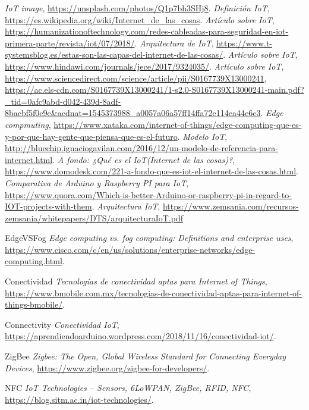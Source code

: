\documentclass{article}
\begin{document}
\begin{thebibliography}{9}

 \textit{IoT image}, \url{https://unsplash.com/photos/Q1p7bh3SHj8}.
 \textit{Definición IoT}, \url{https://es.wikipedia.org/wiki/Internet\_de\_las\_cosas}.
 \textit{Artículo sobre IoT}, \url{https://humanizationoftechnology.com/redes-cableadas-para-seguridad-en-iot-primera-parte/revista/iot/07/2018/}.
 \textit{Arquitectura de IoT}, \url{https://www.t-systemsblog.es/estas-son-las-capas-del-internet-de-las-cosas/}.
 \textit{Artículo sobre IoT}, \url{https://www.hindawi.com/journals/jece/2017/9324035/}.
 \textit{Artículo sobre IoT}, \url{https://www.sciencedirect.com/science/article/pii/S0167739X13000241}, \url{https://ac.els-cdn.com/S0167739X13000241/1-s2.0-S0167739X13000241-main.pdf?_tid=0afc9abd-d042-439d-8adf-8bacbf5f0c9e&acdnat=1545373988_a0057a06a57ff14ffa72e114ea44e6c3}.
 \textit{Edge compmuting}, \url{https://www.xataka.com/internet-of-things/edge-computing-que-es-y-por-que-hay-gente-que-piensa-que-es-el-futuro}.
 \textit{Modelo IoT}, \url{http://bluechip.ignaciogavilan.com/2016/12/un-modelo-de-referencia-para-internet.html}.
 \textit{A fondo: ¿Qué es el IoT(Internet de las cosas)?}, \url{https://www.domodesk.com/221-a-fondo-que-es-iot-el-internet-de-las-cosas.html}.
 \textit{Comparativa de Arduino y Raspberry PI para IoT}, \url{https://www.quora.com/Which-is-better-Arduino-or-raspberry-pi-in-regard-to-IOT-projects-with-them}.
 \textit{Arquitectura IoT}, \url{https://www.zemsania.com/recursos-zemsania/whitepapers/DTS/arquitecturaIoT.pdf}
\item{EdgeVSFog} \textit{Edge computing vs. fog computing: Definitions and enterprise uses}, \url{https://www.cisco.com/c/en/us/solutions/enterprise-networks/edge-computing.html}.
\item{Conectividad} \textit{Tecnologías de conectividad aptas para Internet of Things}, \url{https://www.bmobile.com.mx/tecnologias-de-conectividad-aptas-para-internet-of-things-bmobile/}.
\item{Connectivity} \textit{Conectividad IoT}, \url{https://aprendiendoarduino.wordpress.com/2018/11/16/conectividad-iot/}.
\item{ZigBee} \textit{Zigbee: The Open, Global Wireless Standard for Connecting Everyday Devices}, \url{https://www.zigbee.org/zigbee-for-developers/}.
\item{NFC} \textit{IoT Technologies – Sensors, 6LoWPAN, ZigBee, RFID, NFC}, \url{https://blog.sitm.ac.in/iot-technologies/}.

\end{thebibliography}
\end{document}
